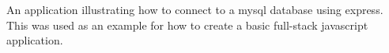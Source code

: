 

{An application illustrating how to connect to a mysql database using express. This was used as an example for how to create a basic full-stack javascript application.}